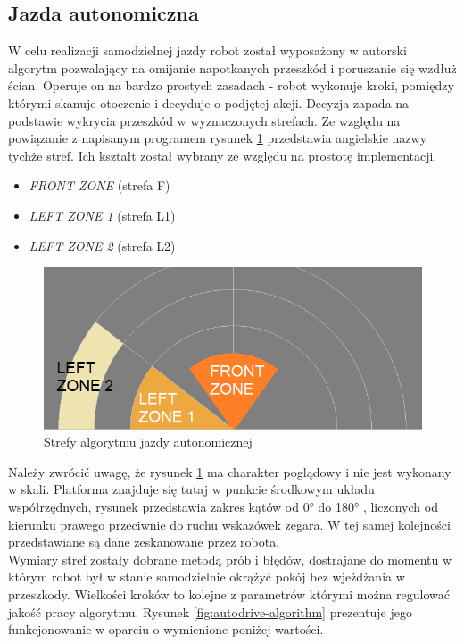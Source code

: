 \subsection{Jazda autonomiczna}
W celu realizacji samodzielnej jazdy robot został wyposażony w autorski algorytm pozwalający na omijanie napotkanych przeszkód i poruszanie się wzdłuż ścian. Operuje on na bardzo prostych zasadach - robot wykonuje kroki, pomiędzy którymi skanuje otoczenie i decyduje o podjętej akcji. Decyzja zapada na podstawie wykrycia przeszkód w wyznaczonych strefach. Ze względu na powiązanie z napisanym programem rysunek \ref{fig:autodrive-zones} przedstawia angielskie nazwy tychże stref. Ich kształt został wybrany ze względu na prostotę implementacji.
\begin{itemize}
    \item \emph{FRONT ZONE} (strefa F)
    \item \emph{LEFT ZONE 1} (strefa L1)
    \item \emph{LEFT ZONE 2} (strefa L2)
\end{itemize}

\begin{figure}[ht]
	\centering
		\includegraphics[width=1\linewidth]{rys/autodrive-zones.png}
	\caption{Strefy algorytmu jazdy autonomicznej}
	\label{fig:autodrive-zones}
\end{figure}

Należy zwrócić uwagę, że rysunek \ref{fig:autodrive-zones} ma charakter poglądowy i nie jest wykonany w skali. Platforma znajduje się tutaj w punkcie środkowym układu współrzędnych, rysunek przedstawia zakres kątów od 0° do 180° , liczonych od kierunku prawego przeciwnie do ruchu wskazówek zegara. W tej samej kolejności przedstawiane są dane zeskanowane przez robota.
\\
Wymiary stref zostały dobrane metodą prób i błędów, dostrajane do momentu w którym robot był w stanie samodzielnie okrążyć pokój bez wjeżdżania w przeszkody.
Wielkości kroków to kolejne z parametrów którymi można regulować jakość pracy algorytmu. Rysunek \ref{fig:autodrive-algorithm} prezentuje jego funkcjonowanie w oparciu o wymienione poniżej wartości.

